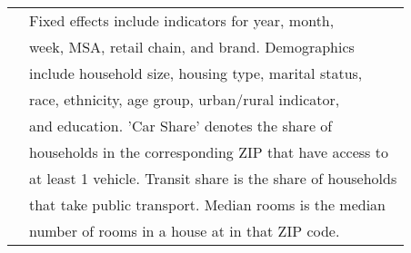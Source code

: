 \begin{table}[!htbp]
\begin{tabular}{@{\extracolsep{5pt}}lcccc}
 & \multicolumn{4}{l}{Fixed effects include indicators for year, month, } \\ 
 & \multicolumn{4}{l}{week, MSA, retail chain, and brand. Demographics } \\ 
 & \multicolumn{4}{l}{include household size, housing type, marital status, } \\ 
 & \multicolumn{4}{l}{race, ethnicity, age group, urban/rural indicator, } \\ 
 & \multicolumn{4}{l}{and education. 'Car Share' denotes the share of } \\ 
 & \multicolumn{4}{l}{households in the corresponding ZIP that have access to } \\ 
 & \multicolumn{4}{l}{at least 1 vehicle. Transit share is the share of households } \\ 
 & \multicolumn{4}{l}{that take public transport. Median rooms is the median } \\ 
 & \multicolumn{4}{l}{number of rooms in a house at in that ZIP code.} \\ 
\end{tabular} 
\end{table} 
